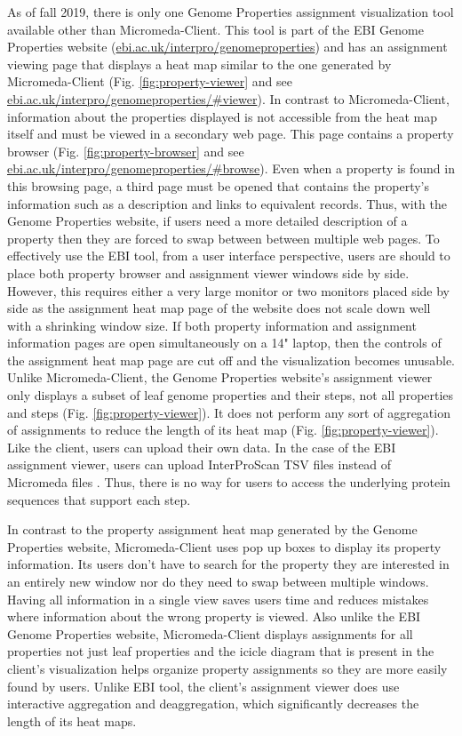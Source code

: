 As of fall 2019, there is only one Genome Properties assignment visualization tool available other than Micromeda-Client. This tool is part of the EBI Genome Properties website \cite{richardson2018genome} (\href{ebi.ac.uk/interpro/genomeproperties}{ebi.ac.uk/interpro/genomeproperties}) and has an assignment viewing page that displays a heat map similar to the one generated by Micromeda-Client \cite{richardson2018genome}  (Fig. \ref{fig:property-viewer} and see \href{ebi.ac.uk/interpro/genomeproperties/\#viewer}{ebi.ac.uk/interpro/genomeproperties/\#viewer}). In contrast to Micromeda-Client, information about the properties displayed is not accessible from the heat map itself and must be viewed in a secondary web page. This page contains a property browser (Fig. \ref{fig:property-browser} and see \href{ebi.ac.uk/interpro/genomeproperties/\#browse}{ebi.ac.uk/interpro/genomeproperties/\#browse}). Even when a property is found in this browsing page, a third page must be opened that contains the property's information such as a description and links to equivalent records. Thus, with the Genome Properties website, if users need a more detailed description of a property then they are forced to swap between between multiple web pages. To effectively use the EBI tool, from a user interface perspective, users are should to place both property browser and assignment viewer windows side by side. However, this requires either a very large monitor or two monitors placed side by side as the assignment heat map page of the website does not scale down well with a shrinking window size. If both property information and assignment information pages are open simultaneously on a 14" laptop, then the controls of the assignment heat map page are cut off and the visualization becomes unusable. Unlike Micromeda-Client, the Genome Properties website's assignment viewer only displays a subset of leaf genome properties and their steps, not all properties and steps (Fig. \ref{fig:property-viewer}). It does not perform any sort of aggregation of assignments to reduce the length of its heat map (Fig. \ref{fig:property-viewer}). Like the client, users can upload their own data. In the case of the EBI assignment viewer, users can upload InterProScan TSV files instead of Micromeda files \cite{richardson2018genome}. Thus, there is no way for users to access the underlying protein sequences that support each step.

In contrast to the property assignment heat map generated by the Genome Properties website, Micromeda-Client uses pop up boxes to display its property information. Its users don't have to search for the property they are interested in an entirely new window nor do they need to swap between multiple windows. Having all information in a single view saves users time and reduces mistakes where information about the wrong property is viewed. Also unlike the EBI Genome Properties website, Micromeda-Client displays assignments for all properties not just leaf properties and the icicle diagram that is present in the client's visualization helps organize property assignments so they are more easily found by users. Unlike EBI tool, the client's assignment viewer does use interactive aggregation and deaggregation, which significantly decreases the length of its heat maps.


